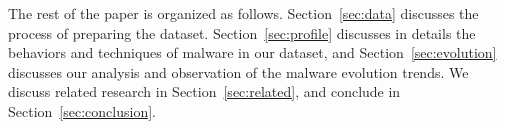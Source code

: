 The rest of the paper is organized as follows. Section~\ref{sec:data} discusses
the process of preparing the dataset.
Section~\ref{sec:profile} discusses in details the behaviors and techniques of malware in our dataset,
and Section~\ref{sec:evolution} discusses our analysis and observation of the malware evolution trends.
We discuss related research in Section~\ref{sec:related},
and conclude in Section~\ref{sec:conclusion}.

